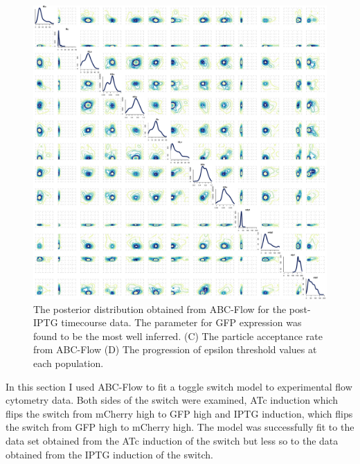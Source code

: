 \begin{figure}[htbp]
\centerfloat
	\includegraphics[width=\textwidth]{../../chapters/chapterABCFlow/images/real_data_stuff/posterior2D_pop9_100p-IPTG.pdf}
	\caption[Posterior distribution of inferred parameters for post-IPTG induction of the toggle switchn]{\label{fig:1atc-post} The posterior distribution obtained from ABC-Flow for the post-IPTG timecourse data. The parameter for GFP expression was found to be the most well inferred. (C) The particle acceptance rate from ABC-Flow (D) The progression of epsilon threshold values at each population.}
\end{figure}







In this section I used ABC-Flow to fit a toggle switch model to experimental flow cytometry data. Both sides of the switch were examined, ATc induction which flips the switch from mCherry high to GFP high and IPTG induction, which flips the switch from GFP high to mCherry high. The model was successfully fit to the data set obtained from the ATc induction of the switch but less so to the data obtained from the IPTG induction of the switch. 
\clearpage
